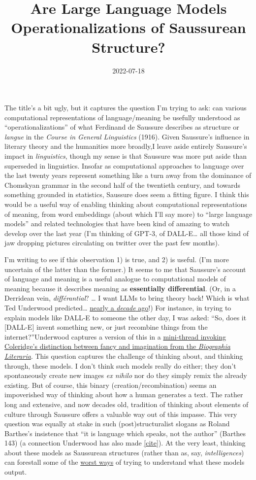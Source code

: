 \documentclass[
  12pt,
]{article}
\title{Are Large Language Models Operationalizations of Saussurean
Structure?}
\author{}
\date{2022-07-18}
\begin{document}
The title's a bit ugly, but it captures the question I'm trying to ask:
can various computational representations of language/meaning be
usefully understood as ``operationalizations'' of what Ferdinand de
Saussure describes as structure or \emph{langue} in the \emph{Course in
General Linguistics} (1916). Given Saussure's influence in literary
theory and the humanities more broadly,{I leave aside entirely
Saussure's impact in \emph{linguistics}, though my sense is that
Saussure was more put aside than superseded in linguistics. Insofar as
computational approaches to language over the last twenty years
represent something like a turn away from the dominance of Chomskyan
grammar in the second half of the twentieth century, and towards
something grounded in statistics, Saussure does seem a fitting figure.}
I think this would be a useful way of enabling thinking about
computational representations of meaning, from word embeddings (about
which I'll say more) to ``large language models'' and related
technologies that have been kind of amazing to watch develop over the
last year (I'm thinking of GPT-3, of DALL-E\ldots{} all those kind of
jaw dropping pictures circulating on twitter over the past few months).

I'm writing to see if this observation 1) is true, and 2) is useful.
(I'm more uncertain of the latter than the former.) It seems to me that
Saussure's account of language and meaning is a useful analogue to
computational models of meaning because it describes meaning as
\textbf{essentially differential}. (Or, in a Derridean vein,
\emph{différantial}? \ldots{} I want LLMs to bring theory back! Which is
what Ted Underwood predicted\ldots{}
\href{https://tedunderwood.com/2013/08/04/interesting-times-for-literary-theory/}{nearly
a \emph{decade} ago}!) For instance, in trying to explain models like
DALL-E to someone the other day, I was asked: ``So, does it {[}DALL-E{]}
invent something new, or just recombine things from the
internet?''{Underwood captures a version of this in a
\href{https://twitter.com/Ted_Underwood/status/1512813693049917441}{mini-thread
invoking Coleridge's distinction between fancy and imagination from the
\emph{Biographia Literaria}}.} This question captures the challenge of
thinking about, and thinking through, these models. I don't think such
models really do either; they don't spontaneously create new images
\emph{ex nihilo} nor do they simply remix the already existing. But of
course, this binary (creation/recombination) seems an impoverished way
of thinking about how a human generates a text. The rather long and
extensive, and now decades old, tradition of thinking about elements of
culture through Saussure offers a valuable way out of this impasse. This
very question was equally at stake in such (post)structuralist slogans
as Roland Barthes's insistence that ``it is language which speaks, not
the author'' (Barthes 143) (a connection Underwood has also made
\href{https://twitter.com/Ted_Underwood/status/1536681676125913088}{{[}cite{]}}).
At the very least, thinking about these models as Saussurean structures
(rather than as, say, \emph{intelligences}) can forestall some of the
\href{https://www.washingtonpost.com/technology/2022/06/11/google-ai-lamda-blake-lemoine/}{worst
ways} of trying to understand what these models output.
\end{document}
